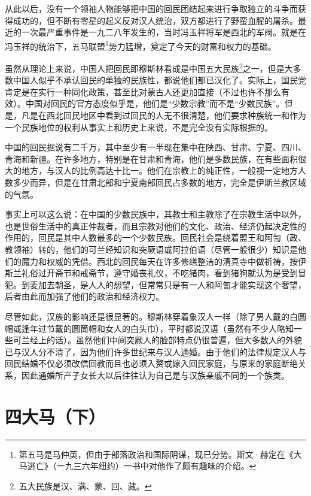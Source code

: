 \documentclass[10pt]{book}
\begin{document}
从此以后，没有一个领袖人物能够把中国的回民团结起来进行争取独立的斗争而获得成功的，但不断有零星的起义反对汉人统治，双方都进行了野蛮血腥的屠杀。最近的一次最严重事件是一九二八年发生的，当时冯玉祥将军是西北的军阀。就是在冯玉祥的统治下，五马联盟\footnote{第五马是马仲英，但由于部落政治和国际阴谋，现已分势。斯文·赫定在《大马逃亡》（一九三六年纽约）一书中对他作了颇有趣味的介绍。}势力猛增，奠定了今天的财富和权力的基础。

虽然从理论上来说，中国人把回民即穆斯林看成是中国五大民族\footnote{五大民族是汉、满、蒙、回、藏。}之一，但是大多数中国人似乎不承认回民的单独的民族性，都说他们都已汉化了。实际上，国民党肯定是在实行一种同化政策，甚至比对蒙古人还更加直接（不过也许不那么有效）。中国对回民的官方态度似乎是，他们是“少数宗教”而不是“少数民族”。但是，凡是在西北回民地区中看到过回民的人无不很清楚，他们要求种族统一和作为一个民族地位的权利从事实上和历史上来说，不是完全没有实际根据的。

中国的回民据说有二千万，其中至少有一半现在集中在陕西、甘肃、宁夏、四川、青海和新疆。在许多地方，特别是在甘肃和青海，他们是多数民族，在有些面积很大的地方，与汉人的比例高达十比一。他们在宗教上的纯正性，一般视一定地方人数多少而异，但是在甘肃北部和宁夏南部回民占多数的地方，完全是伊斯兰教区域的气氛。

事实上可以这么说：在中国的少数民族中，其教士和主教除了在宗教生活中以外，也是世俗生活中的真正仲裁者，而且宗教对他们的文化、政治、经济仍起决定性的作用的，回民是其中人数最多的一个少数民族。回民社会是绕着盟王和阿訇（政、教领袖）转的，他们的可兰经知识和突厥语或阿拉伯语（尽管一般很少）知识是他们的魔力和权威的凭借。西北的回民每天在许多修缮整洁的清真寺中做祈祷，按伊斯兰礼俗过开斋节和戒斋节，遵守婚丧礼仪，不吃猪肉，看到猪狗就认为是受到冒犯。到麦加去朝圣，是人人的想望，但常常只是有一人和阿訇才能实现这个奢望，后者由此而加强了他们的政治和经济权力。

尽管如此，汉族的影响还是很显著的。穆斯林穿着象汉人一样（除了男人戴的白圆帽或逢年过节戴的圆筒帽和女人的白头巾），平时都说汉语（虽然有不少人略知一些可兰经上的话）。虽然他们中间突厥人的脸部特点仍很普遍，但大多数人的外貌已与汉人分不清了，因为他们许多世纪来与汉人通婚。由于他们的法律规定汉人与回民结婚不仅必须改信回教而且也必须入赘或嫁入回民家庭，与原来的家庭断绝关系，因此通婚所产子女长大以后往往认为自己是与汉族亲戚不同的一个族类。



\section{四大马（下）}
\end{document}
